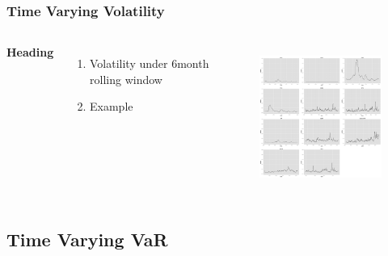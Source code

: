 \documentclass{beamer}
\newcommand\Fontviii{\fontsize{8}{9.2}\selectfont}
\begin{document}
\begin{frame}
\frametitle{Time Varying Volatility}
\Fontviii
\begin{columns}[c] %

\textbf{Heading}
\begin{enumerate}
\item 
Volatility under 6\-month rolling window
\item Example
\end{enumerate}

\begin{figure}[h]
\centering 
\includegraphics[width=6.5cm]{../results/volatility6mon}
\label{fig: variance6mon}
\end{figure}
\end{columns}
\end{frame}

\subsection{Time Varying VaR}
\end{document}

